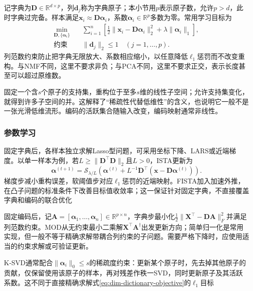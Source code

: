 记字典为$\bm{D}\in\mathbb{R}^{d\times p}$，列$\bm{d}_j$称为字典原子；本小节用$p$表示原子数，允许$p>d$，此时字典过完备。样本满足$\bm{x}_i\approx\bm{D}\bm{\alpha}_i$，系数$\bm{\alpha}_i\in\mathbb{R}^{p}$多数为零。常用学习目标为
\begin{equation}
  \begin{aligned}
  \min_{\bm{D},\{\bm{\alpha}_i\}}\quad&
   \sum_{i=1}^{n}\left[
      \tfrac12\lVert\bm{x}_i-\bm{D}\bm{\alpha}_i\rVert_2^2
      +\lambda\lVert\bm{\alpha}_i\rVert_1\right],\\
  \text{约束}\quad&\lVert\bm{d}_j\rVert_2\leq1
                 \quad(j=1,\ldots,p).
  \end{aligned}
  \label{eq:dim-dictionary-objective}
\end{equation}
列范数约束防止把字典无限放大、系数相应缩小，以任意降低$\ell_1$惩罚而不改变重构。与NMF不同，这里不要求非负；与PCA不同，这里不要求正交，表示长度甚至可以超过原维数。

固定一个含$s$个原子的支持集，重构位于至多$s$维的线性子空间；允许支持集变化，就得到许多子空间的并。这解释了“稀疏性代替低维性”的含义，也说明它一般不是一张光滑低维流形。编码的活跃集合随输入改变，编码映射通常非线性。

\subsubsection{参数学习}
\label{sec:dim-sparse-coding-learning}

固定字典后，各样本独立求解Lasso型问题，可采用坐标下降、LARS或近端梯度。以单一样本为例，若$L\geq\lVert\bm{D}^{\top}\bm{D}\rVert_2$且$L>0$，ISTA更新为
\begin{equation}
  \bm{\alpha}^{(t+1)}
  =\mathcal{S}_{\lambda/L}\left(
      \bm{\alpha}^{(t)}
      +L^{-1}\bm{D}^{\top}
          (\bm{x}-\bm{D}\bm{\alpha}^{(t)})\right).
  \label{eq:dim-ista}
\end{equation}
梯度步减小重构误差，软阈值步对应$\ell_1$惩罚的近端映射。FISTA加入加速外推，在凸子问题的标准条件下改善目标值收敛率；这一保证针对固定字典，不直接覆盖字典和编码的联合优化

固定编码后，记$\bm{A}=[\bm{\alpha}_1,\ldots,\bm{\alpha}_n]\in\mathbb{R}^{p\times n}$，字典步最小化$\frac12\lVert\bm{X}^{\top}-\bm{D}\bm{A}\rVert_F^2$并满足列范数约束。MOD从无约束最小二乘解$\bm{X}^{\top}\bm{A}^{\dagger}$出发更新方向；简单归一化是常用实现，但一般不等于精确求解带耦合列约束的子问题。需要严格下降时，应使用适当的约束求解或可验证更新。

K-SVD通常配合$\lVert\bm{\alpha}_i\rVert_0\leq s$的稀疏度约束：更新某个原子时，先去掉其他原子的贡献，仅保留使用该原子的样本，再对残差作秩一SVD，同时更新原子及其活跃系数。这不同于直接精确求解式\eqref{eq:dim-dictionary-objective}的$\ell_1$目标

